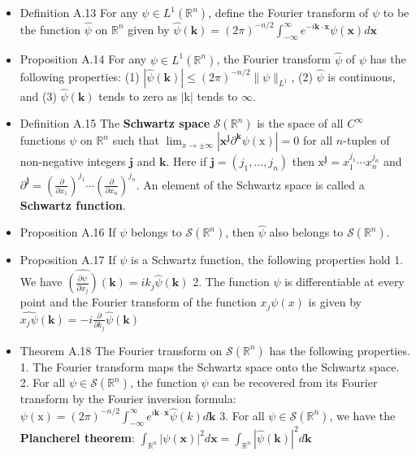 \begin{itemize}
\item Definition A.13 For any $\psi \in L^{1}\left(\mathbb{R}^{n}\right)$, define the Fourier transform of $\psi$ to be the function $\hat{\psi}$ on $\mathbb{R}^{n}$ given by $\hat{\psi}(\mathbf{k})=(2 \pi)^{-n / 2} \int_{-\infty}^{\infty} e^{-i \mathbf{k} \cdot \mathbf{x}} \psi(\mathbf{x}) d \mathbf{x}$

\item Proposition A.14 For any $\psi \in L^{1}\left(\mathbb{R}^{n}\right)$, the Fourier transform $\hat{\psi}$ of $\psi$ has the following properties: (1) $|\hat{\psi}(\mathbf{k})| \leq(2 \pi)^{-n / 2}\|\psi\|_{L^{1}}$, (2) $\hat{\psi}$ is continuous, and (3) $\hat{\psi}(\mathbf{k})$ tends to zero as $|\mathrm{k}|$ tends to $\infty$.

\item Definition A.15 The \textbf{Schwartz space} $\mathcal{S}\left(\mathbb{R}^{n}\right)$ is the space of all $C^{\infty}$ functions $\psi$ on $\mathbb{R}^{n}$ such that $\lim _{x \rightarrow \pm \infty}\left|\mathbf{x}^{\mathbf{j}} \partial^{\mathbf{k}} \psi(\mathrm{x})\right|=0$ for all $n$-tuples of non-negative integers $\mathbf{j}$ and $\mathbf{k}$. Here if $\mathbf{j}=\left(j_{1}, \ldots, j_{n}\right)$ then $\mathrm{x}^{\mathbf{j}}=x_{1}^{j_{1}} 	\cdots x_{n}^{j_{n}}$ and $\partial^{\mathbf{j}}=\left(\frac{\partial}{\partial x_{1}}\right)^{j_{1}} \cdots\left(\frac{\partial}{\partial x_{n}}\right)^{j_{n}}$. An element of the Schwartz space is called a \textbf{Schwartz function}.

\item Proposition A.16 If $\psi$ belongs to $\mathcal{S}\left(\mathbb{R}^{n}\right)$, then $\hat{\psi}$ also belongs to $\mathcal{S}\left(\mathbb{R}^{n}\right)$.

\item Proposition A.17 If $\psi$ is a Schwartz function, the following properties hold
1. We have $\widehat {\left({\frac{\partial \psi}{\partial x_{j}}}\right)}	 (\mathbf{k})=i k_{j} \hat{\psi}(\mathbf{k})$ 2. The function $\hat{\psi}$ is differentiable at every point and the Fourier transform of the function $x_{j} \psi(x)$ is given by $\widehat{x_{j} \psi}(\mathbf{k})=-i \frac{\partial}{\partial k_{j}} \hat{\psi}(\mathbf{k})$

\item Theorem A.18 The Fourier transform on $\mathcal{S}\left(\mathbb{R}^{n}\right)$ has the following properties.
1. The Fourier transform maps the Schwartz space onto the Schwartz space.
2. For all $\psi \in \mathcal{S}\left(\mathbb{R}^{n}\right)$, the function $\psi$ can be recovered from its Fourier transform by the Fourier inversion formula: $\psi(\mathrm{x})=(2 \pi)^{-n / 2} \int_{-\infty}^{\infty} e^{i \mathbf{k} \cdot \mathbf{x}} \hat{\psi}(k) d \mathbf{k}$
3. For all $\psi \in \mathcal{S}\left(\mathbb{R}^{n}\right)$, we have the \textbf{Plancherel theorem}: $\int_{\mathbb{R}^{n}}|\psi(\mathbf{x})|^{2} d \mathbf{x}=\int_{\mathbb{R}^{n}}|\hat{\psi}(\mathbf{k})|^{2} d \mathbf{k}$


\end{itemize}
